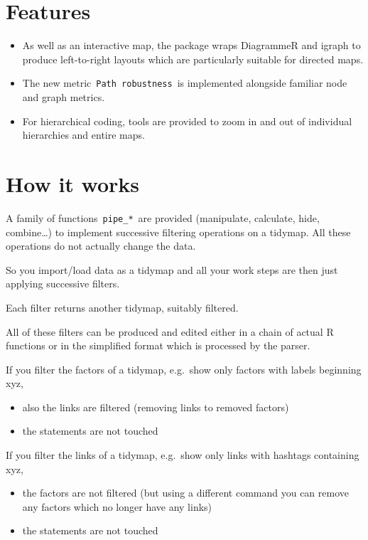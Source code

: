 \documentclass[
]{book}
\providecommand{\tightlist}{%
  \setlength{\itemsep}{0pt}\setlength{\parskip}{0pt}}
\begin{document}
\hypertarget{features}{%
\section{\texorpdfstring{\textbf{Features}}{Features}}\label{features}}

\begin{itemize}
\tightlist
\item
  As well as an interactive map, the package wraps DiagrammeR and igraph to produce left-to-right layouts which are particularly suitable for directed maps.
\item
  The new metric~\texttt{Path\ robustness}~is implemented alongside familiar node and graph metrics.
\item
  For hierarchical coding, tools are provided to zoom in and out of individual hierarchies and entire maps.
\end{itemize}

\hypertarget{how-it-works}{%
\section{\texorpdfstring{\textbf{How it works}}{How it works}}\label{how-it-works}}

A family of functions~\texttt{pipe\_*}~are provided (manipulate, calculate, hide, combine\ldots) to implement successive filtering operations on a tidymap. All these operations do not actually change the data.

So you import/load data as a tidymap and all your work steps are then just applying successive filters.

Each filter returns another tidymap, suitably filtered.

All of these filters can be produced and edited either in a chain of actual R functions or in the simplified format which is processed by the parser.

If you filter the factors of a tidymap, e.g.~show only factors with labels beginning xyz,

\begin{itemize}
\tightlist
\item
  also the links are filtered (removing links to removed factors)
\item
  the statements are not touched
\end{itemize}

If you filter the links of a tidymap, e.g.~show only links with hashtags containing xyz,

\begin{itemize}
\tightlist
\item
  the factors are not filtered (but using a different command you can remove any factors which no longer have any links)
\item
  the statements are not touched
\end{itemize}
\end{document}
